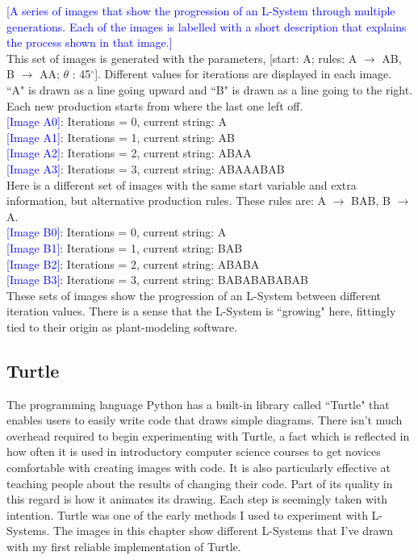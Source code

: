 \documentclass[12pt,twoside]{reedthesis}
\begin{document}
\textcolor{blue}{[A series of images that show the progression of an L-System through multiple generations. Each of the images is labelled with a short description that explains the process shown in that image.]}\\

This set of images is generated with the parameters, [start: A; rules: A $\rightarrow$ AB, B $\rightarrow$ AA; $\theta$ : 45$^{\circ}$]. Different values for iterations are displayed in each image. ``A" is drawn as a line going upward and ``B" is drawn as a line going to the right. Each new production starts from where the last one left off. 
\\\textcolor{blue}{[Image A0]}: Iterations = 0, current string: A
\\\textcolor{blue}{[Image A1]}: Iterations = 1, current string: AB
\\\textcolor{blue}{[Image A2]}: Iterations = 2, current string: ABAA
\\\textcolor{blue}{[Image A3]}: Iterations = 3, current string: ABAAABAB \\

Here is a different set of images with the same start variable and extra information, but alternative production rules. These rules are: A $\rightarrow$ BAB, B $\rightarrow$ A.
\\\textcolor{blue}{[Image B0]}: Iterations = 0, current string: A
\\\textcolor{blue}{[Image B1]}: Iterations = 1, current string: BAB
\\\textcolor{blue}{[Image B2]}: Iterations = 2, current string: ABABA
\\\textcolor{blue}{[Image B3]}: Iterations = 3, current string: BABABABABAB\\

These sets of images show the progression of an L-System between different iteration values. There is a sense that the L-System is ``growing" here, fittingly tied to their origin as plant-modeling software. 

\subsection{Turtle}

	The programming language Python has a built-in library called ``Turtle" that enables users to easily write code that draws simple diagrams. There isn't much overhead required to begin experimenting with Turtle, a fact which is reflected in how often it is used in introductory computer science courses to get novices comfortable with creating images with code. It is also particularly effective at teaching people about the results of changing their code. Part of its quality in this regard is how it animates its drawing. Each step is seemingly taken with intention. Turtle was one of the early methods I used to experiment with L-Systems. The images in this chapter show different L-Systems that I've drawn with my first reliable implementation of Turtle.\\
	
\end{document}
